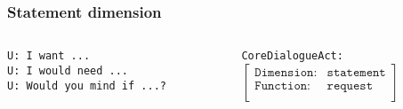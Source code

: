 \documentclass[11pt]{beamer}
\begin{document}
\begin{frame}[fragile]
\frametitle{Statement dimension}
	\begin{center}
	\end{center}
	\vspace{15pt}
	\begin{columns}
		\begin{column}{0.60\textwidth}
		{\color{teal} 
			\texttt{U: I want ...}\\
			\vspace{10pt}
			\texttt{U: I would need ...}\\
			\vspace{10pt}
			\texttt{U: Would you mind if ...?}\\
		}
		\end{column}
		\begin{column}{0.40\textwidth}
			\footnotesize
			\texttt{CoreDialogueAct:} \\
				\vspace{10pt}
				$\begin{bmatrix}
						\texttt{Dimension:}    & \texttt{statement}\\ 
						\texttt{Function:}     & \texttt{request}\\ 
				\end{bmatrix}$
		\end{column}
	\end{columns}
\end{frame}
\end{document}
